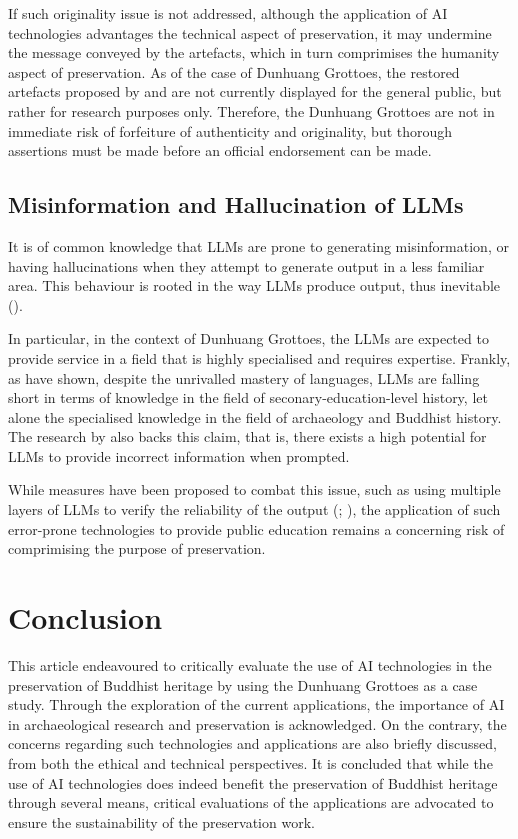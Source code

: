 If such originality issue is not addressed, although the application of AI technologies advantages the technical
aspect of preservation, it may undermine the message conveyed by the artefacts, which in turn comprimises the
humanity aspect of preservation. As of the case of Dunhuang Grottoes, the restored artefacts proposed by
 and  are not currently
displayed for the general public, but rather for research purposes only. Therefore, the Dunhuang Grottoes are
not in immediate risk of forfeiture of authenticity and originality, but thorough assertions must be made
before an official endorsement can be made.

\subsection{Misinformation and Hallucination of LLMs}

It is of common knowledge that LLMs are prone to generating misinformation, or having hallucinations when they
attempt to generate output in a less familiar area. This behaviour is rooted in the way LLMs produce output,
thus inevitable ().

In particular, in the context of Dunhuang Grottoes,
the LLMs are expected to provide service in a field that is highly specialised and requires expertise. Frankly,
as  have shown, despite the unrivalled mastery of languages,
LLMs are falling short in terms of knowledge in the field of seconary-education-level history, let alone the
specialised knowledge in the field of archaeology and Buddhist history. The research by
 also backs this claim, that is, there exists a high potential for LLMs
to provide incorrect information when prompted.

While measures have been proposed to combat this issue, such as using multiple layers of LLMs to verify the 
reliability of the output
(; ),
the application of such error-prone technologies to provide public education remains a concerning risk
of comprimising the purpose of preservation.

\section{Conclusion}

This article endeavoured to critically evaluate the use of AI technologies in the preservation of Buddhist
heritage by using the Dunhuang Grottoes as a case study. Through the exploration of the current applications,
the importance of AI in archaeological research and preservation is acknowledged. On the contrary, the concerns
regarding such technologies and applications are also briefly discussed, from both the ethical and technical
perspectives. It is concluded that while the use of AI technologies does indeed benefit the preservation of
Buddhist heritage through several means, critical evaluations of the applications are advocated to ensure the
sustainability of the preservation work.

\printbibliography